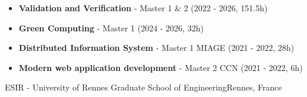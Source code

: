 
{\begin{itemize}
    \item \textbf{Validation and Verification} - Master 1 \& 2 (2022 - 2026, 151.5h)
    \item \textbf{Green Computing} - Master 1 (2024 - 2026, 32h)
    \item \textbf{Distributed Information System} - Master 1 MIAGE (2021 - 2022, 28h)
    \item \textbf{Modern web application development} - Master 2 CCN (2021 - 2022, 6h)
\end{itemize}}

{ESIR - University of Rennes Graduate School of Engineering}{Rennes, France}{}
